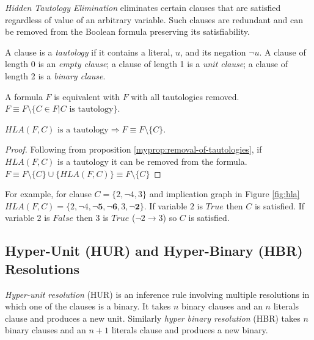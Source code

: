 \emph{Hidden Tautology Elimination} eliminates certain clauses that
are satisfied regardless of value of an arbitrary variable. Such
clauses are redundant and can be removed from the Boolean formula
preserving its satisfiability.

\begin{mydef}
  A clause is a \emph{tautology} if it contains a literal, $u$, and its negation
  $\neg u$. A clause of length 0 is an \emph{empty clause}; a clause of length 1
  is a \emph{unit clause}; a clause of length 2 is a \emph{binary clause}. 
\end{mydef}

\begin{myprop}[TE]
  \label{myprop:removal-of-tautologies}
  A formula $F$ is equivalent with $F$ with all tautologies removed.
  $F \equiv F \setminus \{ C \in F | C \text{ is tautology}\}$.
\end{myprop}

\begin{myprop}[HTE]
  $HLA(F, C) \text{ is a tautology} \Rightarrow F \equiv F \setminus \{C\}$.
\end{myprop}

\begin{proof}
  Following from proposition \ref{myprop:removal-of-tautologies},
  if $HLA(F, C)$ is a tautology it can be removed from the formula.
  $F \equiv F \setminus \{C\} \cup \{HLA(F, C)\} \equiv F \setminus \{C\}$
\end{proof}

For example, for clause $C = \{ 2, \neg 4, 3\}$ and implication graph
in Figure \ref{fig:hla} $HLA(F, C) = \{2, \neg 4, \mathbf{\neg 5,
\neg 6}, 3, \mathbf{\neg 2} \}$.  If variable $2$ is $True$ then
$C$ is satisfied. If variable $2$ is $False$ then $3$ is $True$
($\neg 2 \rightarrow 3$) so $C$ is satisfied.


\subsection{Hyper-Unit (HUR) and Hyper-Binary (HBR) Resolutions}
\label{ssec:hbr}

\emph{Hyper-unit resolution} (HUR) \cite{Kusper02solvingthe} is
an inference rule involving multiple resolutions in which one of
the clauses is a binary. It takes $n$ binary clauses and an $n$
literals clause and produces a new unit.  Similarly \emph{hyper
binary resolution} (HBR) \cite{Bacchus03effectivepreprocessing} takes
$n$ binary clauses and an $n + 1$ literals clause and produces a
new binary.

